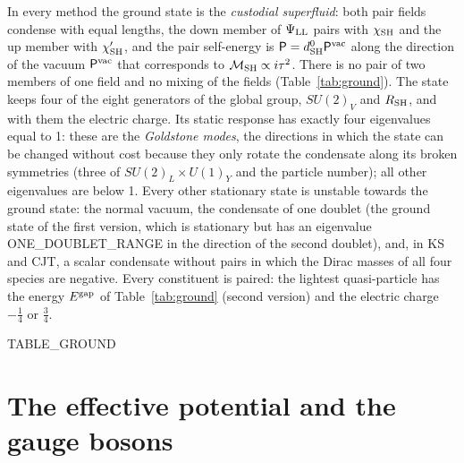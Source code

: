 \documentclass[aps,prd,twocolumn,superscriptaddress,nofootinbib,floatfix,longbibliography]{revtex4-2}
\newcommand{\LL}{{\rm LL}}
\newcommand{\SH}{{\rm SH}}
\begin{document}
In every method the ground state is the \emph{custodial superfluid}: both pair fields condense with equal lengths, the
down member of $\Psi_\LL$ pairs with $\chi_\SH$ and the up member with $\chi'_\SH$, and the pair self-energy is
$\mathsf P=d^0_\SH\mathsf P^{\rm vac}$ along the direction of the vacuum $\mathsf P^{\rm vac}$ that corresponds to
$\mathcal M_\SH\propto i\tau^2$. There is no pair of two members of one field and no mixing of the fields
(Table~\ref{tab:ground}). The state keeps four of the eight generators of the global group, $SU(2)_V$ and $R_\SH$, and
with them the electric charge. Its static response has exactly four eigenvalues equal to 1: these are the
\emph{Goldstone modes}, the directions in which the state can be changed without cost because they only rotate the
condensate along its broken symmetries (three of $SU(2)_L\times U(1)_Y$ and the particle number); all other eigenvalues
are below 1. Every other stationary state is unstable towards the ground state: the normal vacuum, the condensate of
one doublet (the ground state of the first version, which is stationary but has an eigenvalue {{ONE_DOUBLET_RANGE}} in
the direction of the second doublet), and, in KS and CJT, a scalar condensate without pairs in which the Dirac masses of
all four species are negative. Every constituent is paired: the lightest quasi-particle has the energy $E^{\rm gap}$ of
Table~\ref{tab:ground} (second version) and the electric charge $-\frac14$ or $\frac34$.

\begin{table}[t]
\caption{The ground states, second version (two singlets) and, for comparison, first version (one singlet): the pair
self-energy $d^0_\SH$, the energy per volume $\mathcal E$ measured from the normal vacuum, and the gap $E^{\rm gap}$, the
lowest energy of a quasi-particle; units of $\Lambda_\LL$.}
\label{tab:ground}
\begin{ruledtabular}
{{TABLE_GROUND}}
\end{ruledtabular}
\end{table}

\section{The effective potential and the gauge bosons}
\label{sec:gauge}
\end{document}
